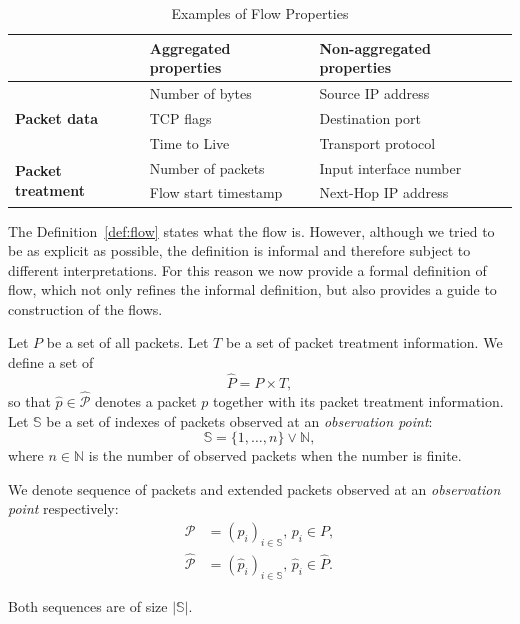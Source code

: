 \begin{table}[ht!]
	\centering
	\begin{tabular}{lll}
	\toprule
	                                           & \textbf{Aggregated properties}  & \textbf{Non-aggregated properties}  \\ \midrule
	\multirow{3}{*}{\textbf{Packet data}}      & Number of bytes                 & Source IP address                   \\ 
	                                           & TCP flags                       & Destination port                    \\ 
	                                           & Time to Live                    & Transport protocol                  \\ \midrule
	\multirow{2}{*}{\textbf{Packet treatment}} & Number of packets               & Input interface number              \\ 
	                                           & Flow start timestamp            & Next-Hop IP address                 \\ \bottomrule
	\end{tabular}
	\caption{Examples of Flow Properties}
	\label{tab:flow.properties}
\end{table}

The Definition~\ref{def:flow} states what the flow is. However, although we tried to be as explicit as possible, the definition is informal and therefore subject to different interpretations. For this reason we now provide a formal definition of flow, which not only refines the informal definition, but also provides a guide to construction of the flows.

\begin{defn}
Let $P$ be a set of all packets. Let $T$ be a set of packet treatment information. We define a set of 
\begin{equation*}
	\widehat{P} = P\times T,
\end{equation*}
so that $\widehat{p} \in \widehat{\mathcal{P}}$ denotes a packet $p$ together with its packet treatment information. Let $\mathbb{S}$ be a set of indexes of packets observed at an \emph{observation point}:
\begin{equation*}
	\mathbb{S} = \{1, \ldots, n\} \lor \mathbb{N},
\end{equation*}
where $n \in \mathbb{N}$ is the number of observed packets when the number is finite.

We denote sequence of packets and extended packets observed at an \emph{observation point} respectively:
\begin{align*}
	\mathcal{P} &= (p_i)_{i \in \mathbb{S}},\, p_i \in P,\\
	\widehat{\mathcal{P}} &= (\widehat{p}_i)_{i \in \mathbb{S}},\, \widehat{p}_i \in \widehat{P}.
\end{align*}
\end{defn}
Both sequences are of size $|\mathbb{S}|$. 

